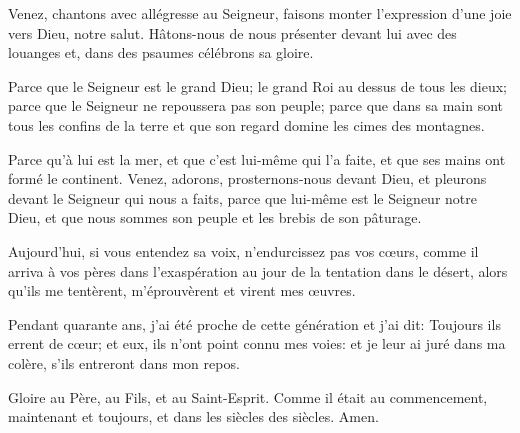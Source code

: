 \item Venez, chantons avec allégresse au Seigneur, faisons monter l'expression d'une joie vers Dieu, notre salut. Hâtons-nous de nous présenter devant lui avec des louanges et, dans des psaumes célébrons sa gloire. 
\item Parce que le Seigneur est le grand Dieu; le grand Roi au dessus de tous les dieux; parce que le Seigneur ne repoussera pas son peuple; parce que dans sa main sont tous les confins de la terre et que son regard domine les cimes des montagnes. 
\item Parce qu'à lui est la mer, et que c'est lui-même qui l'a faite, et que ses mains ont formé le continent.  Venez, adorons, prosternons-nous devant Dieu, et pleurons devant le Seigneur qui nous a faits, parce que lui-même est le Seigneur notre Dieu, et que nous sommes son peuple et les brebis de son pâturage. 
\item Aujourd'hui, si vous entendez sa voix, n'endurcissez pas vos cœurs, comme il arriva à vos pères dans l'exaspération au jour de la tentation dans le désert, alors qu'ils me tentèrent, m'éprouvèrent et virent mes œuvres. 
\item Pendant quarante ans, j'ai été proche de cette génération et j'ai dit: Toujours ils errent de cœur; et eux, ils n'ont point connu mes voies: et je leur ai juré dans ma colère, s'ils entreront dans mon repos. 
\item Gloire au Père, au Fils, et au Saint-Esprit. Comme il était au commencement, maintenant et toujours, et dans les siècles des siècles. Amen. 